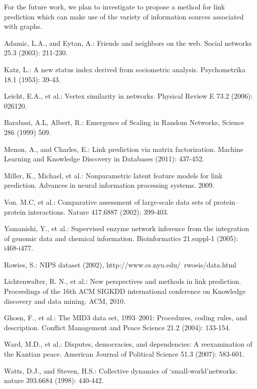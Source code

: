 \documentclass[runningheads,a4paper]{llncs}
\begin{document}
For the future work, we plan to investigate to propose a method for link prediction which can make use of the variety of information sources associated with graphs.

\begin{thebibliography}{4}

 Adamic, L.A., and Eytan, A.: Friends and neighbors on the web. Social networks 25.3 (2003): 211-230.

 Katz, L.: A new status index derived from sociometric analysis. Psychometrika 18.1 (1953): 39-43.

 Leicht, E.A., et al.: Vertex similarity in networks. Physical Review E 73.2 (2006): 026120.

  Barabasi, A.L, Albert, R.: Emergence of Scaling in Random Networks, Science 286 (1999) 509.

 Menon, A., and Charles, E.: Link prediction via matrix factorization. Machine Learning and Knowledge Discovery in Databases (2011): 437-452.

 Miller, K., Michael, et al.: Nonparametric latent feature models for link prediction. Advances in neural information processing systems. 2009.

 Von. M.C, et al.: Comparative assessment of large-scale data sets of protein–protein interactions. Nature 417.6887 (2002): 399-403.

 Yamanishi, Y., et al.: Supervised enzyme network inference from the integration of genomic data and chemical information. Bioinformatics 21.suppl-1 (2005): i468-i477.

 Rowies, S.: NIPS dataset (2002), http://www.cs.nyu.edu/~rwoeis/data.html

 Lichtenwalter, R. N., et al.: New perspectives and methods in link prediction. Proceedings of the 16th ACM SIGKDD international conference on Knowledge discovery and data mining. ACM, 2010.

 Ghosn, F., et al.: The MID3 data set, 1993–2001: Procedures, coding rules, and description. Conflict Management and Peace Science 21.2 (2004): 133-154.

 Ward, M.D., et al.: Disputes, democracies, and dependencies: A reexamination of the Kantian peace. American Journal of Political Science 51.3 (2007): 583-601.

 Watts, D.J., and Steven, H.S.: Collective dynamics of ‘small-world’networks. nature 393.6684 (1998): 440-442.


\end{thebibliography}
\end{document}
